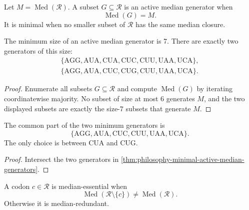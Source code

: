 \begin{definition}
\label{def:philosophy-active-median-generator}
Let $M=\operatorname{Med}(\mathcal{R})$. A subset
$G\subseteq\mathcal{R}$ is an active median generator when
$$
  \operatorname{Med}(G)=M.
$$
It is minimal when no smaller subset of $\mathcal{R}$ has the same
median closure.
\end{definition}

\begin{theorem}
\label{thm:philosophy-minimal-active-median-generators}
The minimum size of an active median generator is $7$. There are exactly
two generators of this size:
$$
\begin{gathered}
  \{\mathrm{AGG},\mathrm{AUA},\mathrm{CUA},\mathrm{CUC},
    \mathrm{CUU},\mathrm{UAA},\mathrm{UCA}\},\\
  \{\mathrm{AGG},\mathrm{AUA},\mathrm{CUC},\mathrm{CUG},
    \mathrm{CUU},\mathrm{UAA},\mathrm{UCA}\}.
\end{gathered}
$$
\end{theorem}
\begin{proof}
Enumerate all subsets $G\subseteq\mathcal{R}$ and compute
$\operatorname{Med}(G)$ by iterating coordinatewise majority. No subset
of size at most $6$ generates $M$, and the two displayed subsets are
exactly the size-$7$ subsets that generate $M$.
\end{proof}

\begin{corollary}
\label{cor:philosophy-rigid-median-skeleton}
The common part of the two minimum generators is
$$
  \{\mathrm{AGG},\mathrm{AUA},\mathrm{CUC},
    \mathrm{CUU},\mathrm{UAA},\mathrm{UCA}\}.
$$
The only choice is between $\mathrm{CUA}$ and $\mathrm{CUG}$.
\end{corollary}
\begin{proof}
Intersect the two generators in
\autoref{thm:philosophy-minimal-active-median-generators}.
\end{proof}

\begin{definition}
\label{def:philosophy-median-essential-codon}
A codon $c\in\mathcal{R}$ is median-essential when
$$
  \operatorname{Med}(\mathcal{R}\setminus\{c\})
  \neq
  \operatorname{Med}(\mathcal{R}).
$$
Otherwise it is median-redundant.
\end{definition}

